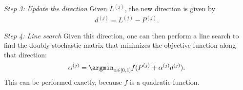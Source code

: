 \documentclass[10pt,journal,cspaper,compsoc]{IEEEtran}
\newcommand{\PmcP}{P \in \mc{P}}
\begin{document}

\emph{Step 3: Update the direction} Given $L^{(j)}$, the new direction is given by
\begin{align}
	d^{(j)}=L^{(j)}-P^{(j)}.
\end{align}


\emph{Step 4: Line search} Given this direction, one can then perform a line search to find the doubly stochastic matrix that minimizes the objective function along that direction:
\begin{align}\label{eq:step}
	\alpha^{(j)} = \argmin_{\alpha \in [0,1]} f(P^{(j)} + \alpha^{(j)} d^{(j)}).
\end{align}
This can be performed exactly, because $f$ is a quadratic function.  
\end{document}
